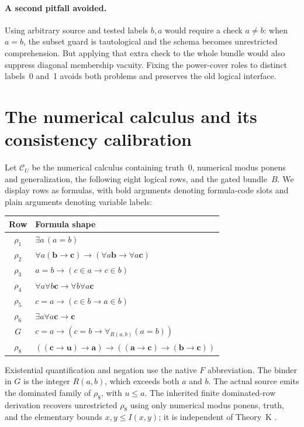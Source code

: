 \documentclass[11pt]{article}
\newcommand{\CU}{\mathcal C_U}
\theoremstyle{definition}\newtheorem{definition}[theorem]{Definition}
\begin{document}
\paragraph{A second pitfall avoided.}
Using arbitrary source and tested labels $b,a$ would require a check
$a\ne b$: when $a=b$, the subset guard is tautological and the schema
becomes unrestricted comprehension. But applying that extra check to the
whole bundle would also suppress diagonal membership vacuity. Fixing the
power-cover roles to distinct labels~0 and~1 avoids both problems and
preserves the old logical interface.

\section{The numerical calculus and its consistency calibration}

Let $\CU$ be the numerical calculus containing truth~0, numerical modus
ponens and generalization, the following eight logical rows, and the gated
bundle~$B$. We display rows as formulas, with bold arguments denoting
formula-code slots and plain arguments denoting variable labels:
\begin{center}\small
\begin{tabular}{cl}
\toprule
Row & Formula shape\\\midrule
$\rho_1$ & $\exists a\,(a=b)$\\
$\rho_2$ & $\forall a(\mathbf b\to\mathbf c)\to
              (\forall a\mathbf b\to\forall a\mathbf c)$\\
$\rho_3$ & $a=b\to(c\in a\to c\in b)$\\
$\rho_4$ & $\forall a\forall b\mathbf c\to\forall b\forall a\mathbf c$\\
$\rho_5$ & $c=a\to(c\in b\to a\in b)$\\
$\rho_6$ & $\exists a\forall a\mathbf c\to\mathbf c$\\
$G$ & $c=a\to(c=b\to\forall_{R(a,b)}(a=b))$\\
$\rho_8$ & $((\mathbf c\to\mathbf u)\to\mathbf a)\to
             ((\mathbf a\to\mathbf c)\to(\mathbf b\to\mathbf c))$\\
\bottomrule
\end{tabular}\end{center}
Existential quantification and negation use the native $F$ abbreviation.
The binder in $G$ is the integer $R(a,b)$, which exceeds both $a$ and $b$.
The actual source emits the dominated family of $\rho_8$, with $u\le a$.
The inherited finite dominated-row derivation recovers unrestricted
$\rho_8$ using only numerical modus ponens, truth, and the elementary
bounds $x,y\le I(x,y)$; it is independent of Theory~K \cite{dominated}.
\end{document}
